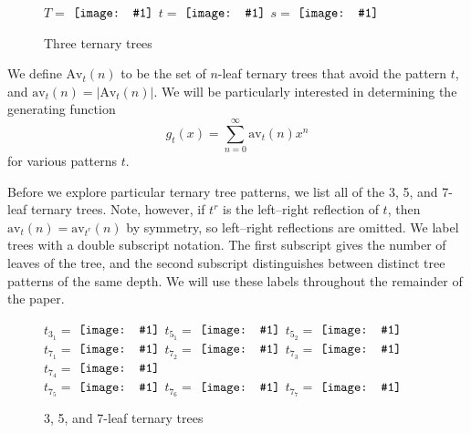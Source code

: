 \documentclass[12pt]{article}
\newcommand{\vcentergraphics}[1]{\ensuremath{\vcenter{\hbox{\texttt{[image: \#1]}}}}}
\begin{document}
\begin{figure}[htb]
\begin{center}
$T=$  \vcentergraphics{ternary_tree_15} \hspace{.4in}
$t=$ \vcentergraphics{ternary_tree_7-2} \hspace{.4in}
$s=$  \vcentergraphics{ternary_tree_7-1}
\end{center}
\caption{Three ternary trees}
\label{Feg1}
\end{figure}

We define $\text{Av}_t(n)$ to be the set of $n$-leaf ternary trees that avoid the pattern $t$, and $\text{av}_t(n)= \left| \text{Av}_t(n) \right|$.  We will be particularly interested in determining the generating function $$\displaystyle{g_t(x)=\sum_{n=0}^\infty \text{av}_t(n) x^n}$$ for various patterns $t$.

Before we explore particular ternary tree patterns, we list all of the 3, 5, and 7-leaf ternary trees.  Note, however, if $t^r$ is the left--right reflection of $t$, then $\text{av}_t(n)=\text{av}_{t^r}(n)$ by symmetry, so left--right reflections are omitted.  We label trees with a double subscript notation.  The first subscript gives the number of leaves of the tree, and the second subscript distinguishes between distinct tree patterns of the same depth.  We will use these labels throughout the remainder of the paper.


\begin{figure}
\begin{center}
$t_{3_1}=$  \vcentergraphics{ternary_tree_3-1} \hspace{.4in}
$t_{5_1}=$  \vcentergraphics{ternary_tree_5-1} \hspace{.4in}
$t_{5_2}=$  \vcentergraphics{ternary_tree_5-2} \\ \vspace{3mm}
$t_{7_1}=$  \vcentergraphics{ternary_tree_7-1} \hspace{.4in}
$t_{7_2}=$  \vcentergraphics{ternary_tree_7-2} \hspace{.4in}
$t_{7_3}=$  \vcentergraphics{ternary_tree_7-3} \hspace{.4in}
$t_{7_4}=$  \vcentergraphics{ternary_tree_7-4} \\ \vspace{3mm}
$t_{7_5}=$  \vcentergraphics{ternary_tree_7-5} \hspace{.4in}
$t_{7_6}=$  \vcentergraphics{ternary_tree_7-6} \hspace{.4in}
$t_{7_7}=$  \vcentergraphics{ternary_tree_7-7}\\
\end{center}
\caption{3, 5, and 7-leaf ternary trees}
\label{F:trees}
\end{figure}
\end{document}
